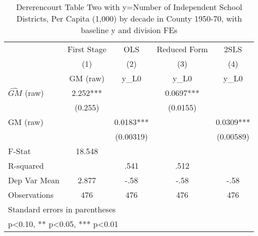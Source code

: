 \begin{table}[htbp]\centering
\def\sym#1{\ifmmode^{#1}\else\(^{#1}\)\fi}
\caption{Dererencourt Table Two with y=Number of Independent School Districts, Per Capita (1,000) by decade in County 1950-70, with baseline y and division FEs}
\begin{tabular}{l*{4}{c}}
\toprule
                    & First Stage   &         OLS   &Reduced Form   &        2SLS   \\
                    &\multicolumn{1}{c}{(1)}&\multicolumn{1}{c}{(2)}&\multicolumn{1}{c}{(3)}&\multicolumn{1}{c}{(4)}\\
                    &\multicolumn{1}{c}{GM  (raw)}&\multicolumn{1}{c}{y\_L0}&\multicolumn{1}{c}{y\_L0}&\multicolumn{1}{c}{y\_L0}\\
\midrule
$\hat{GM}$ (raw)    &       2.252***&               &      0.0697***&               \\
                    &     (0.255)   &               &    (0.0155)   &               \\
\addlinespace
GM  (raw)           &               &      0.0183***&               &      0.0309***\\
                    &               &   (0.00319)   &               &   (0.00589)   \\
\midrule
F-Stat              &      18.548   &               &               &               \\
R-squared           &               &        .541   &        .512   &               \\
Dep Var Mean        &       2.877   &        -.58   &        -.58   &        -.58   \\
Observations        &         476   &         476   &         476   &         476   \\
\bottomrule
\multicolumn{5}{l}{\footnotesize Standard errors in parentheses}\\
\multicolumn{5}{l}{\footnotesize * p<0.10, ** p<0.05, *** p<0.01}\\
\end{tabular}
\end{table}
